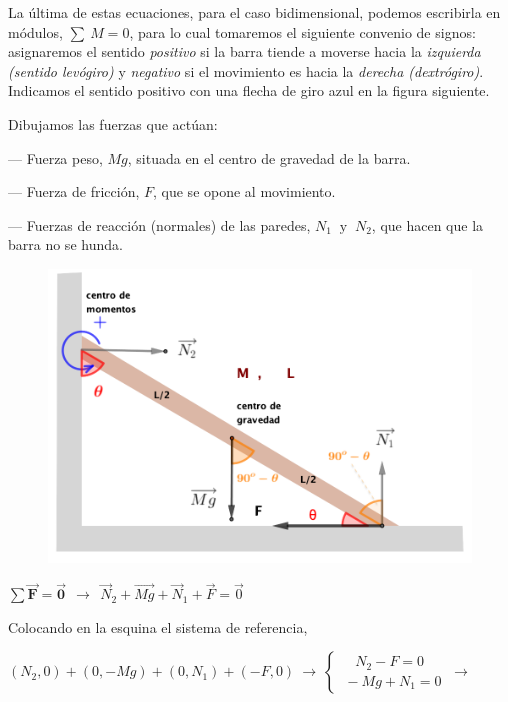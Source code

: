 \vspace{5mm} La última de estas ecuaciones, para el caso bidimensional, podemos escribirla en módulos,  $\sum \ M = 0$, para lo cual tomaremos el siguiente convenio de signos: asignaremos el sentido \emph{positivo} si la barra tiende a moverse hacia la \emph{izquierda (sentido levógiro)} y \emph{negativo} si el movimiento es hacia la \emph{derecha (dextrógiro)}. Indicamos el sentido positivo con una flecha de giro azul en la figura siguiente.

Dibujamos las fuerzas que actúan:


\begin{adjustwidth}{10pt}{10pt}
--- Fuerza peso, $Mg$, situada en el centro de gravedad de la barra.

--- Fuerza de fricción, $F$, que se opone al movimiento.

--- Fuerzas de reacción (normales) de las paredes, $N_1 \ \text{ y } \ N_2$, que hacen que la barra no se hunda.
\end{adjustwidth}

\vspace{1cm}
	\begin{figure}[H]
		\centering
		\includegraphics[width=.6\textwidth]{imagenes/img01-02.png}
	\end{figure}
	
\vspace{5mm}

$\boldsymbol{\displaystyle \sum \overrightarrow F = \overrightarrow 0} \ \ \to \ \ \overrightarrow N_2 + \overrightarrow {Mg} + \overrightarrow N_1 + \overrightarrow F = \overrightarrow 0$

Colocando en la esquina el sistema de referencia, 

$(N_2,0) + (0,-Mg)+(0,N_1)+(-F,0) \ \to \ \begin{cases}
\quad N_2-F=0 \\ \ -Mg+N_1=0 	
 \end{cases}
 \ \to \ $
 
